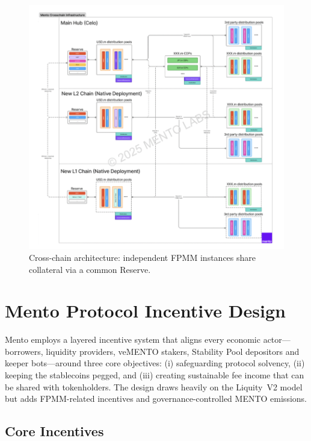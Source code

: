 \documentclass[a4paper]{article}
\providecommand{\hyp}{-}
\theoremstyle{definition}
\begin{document}
\begin{figure}[H]
    \centering
    \includegraphics[width=0.75\linewidth]{figures/fpmm_4.png}
    \caption{Cross\hyp chain architecture: independent FPMM instances share collateral via a
    common Reserve.}
    \label{fig:cross_chain}
\end{figure}


\section{Mento Protocol Incentive Design}
\label{sec:incentive_structure}

Mento employs a layered incentive system that aligns every economic actor—borrowers, liquidity providers, veMENTO stakers, Stability Pool depositors and keeper bots—around three core objectives:  (i) safeguarding protocol solvency, (ii) keeping the stablecoins pegged, and (iii) creating sustainable fee income that can be shared with tokenholders. The design draws heavily on the Liquity~V2 model but adds FPMM-related incentives and governance\hyp controlled MENTO emissions.\\

\subsection{Core Incentives}
\end{document}
